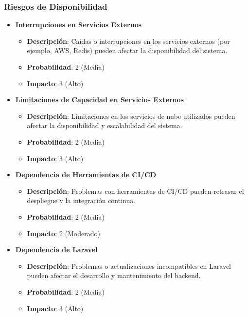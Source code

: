 \documentclass{article}
\begin{document}
\subsubsection{Riesgos de Disponibilidad}

\begin{itemize}
    \item \textbf{Interrupciones en Servicios Externos}
          \begin{itemize}
              \item \textbf{Descripción}: Caídas o interrupciones en los servicios externos (por ejemplo, AWS, Redis) pueden afectar la disponibilidad del sistema.
              \item \textbf{Probabilidad}: 2 (Media)
              \item \textbf{Impacto}: 3 (Alto)
          \end{itemize}

    \item \textbf{Limitaciones de Capacidad en Servicios Externos}
          \begin{itemize}
              \item \textbf{Descripción}: Limitaciones en los servicios de nube utilizados pueden afectar la disponibilidad y escalabilidad del sistema.
              \item \textbf{Probabilidad}: 2 (Media)
              \item \textbf{Impacto}: 3 (Alto)
          \end{itemize}

    \item \textbf{Dependencia de Herramientas de CI/CD}
          \begin{itemize}
              \item \textbf{Descripción}: Problemas con herramientas de CI/CD pueden retrasar el despliegue y la integración continua.
              \item \textbf{Probabilidad}: 2 (Media)
              \item \textbf{Impacto}: 2 (Moderado)
          \end{itemize}

    \item \textbf{Dependencia de Laravel}
          \begin{itemize}
              \item \textbf{Descripción}: Problemas o actualizaciones incompatibles en Laravel pueden afectar el desarrollo y mantenimiento del backend.
              \item \textbf{Probabilidad}: 2 (Media)
              \item \textbf{Impacto}: 3 (Alto)
          \end{itemize}


\end{itemize}
\end{document}
